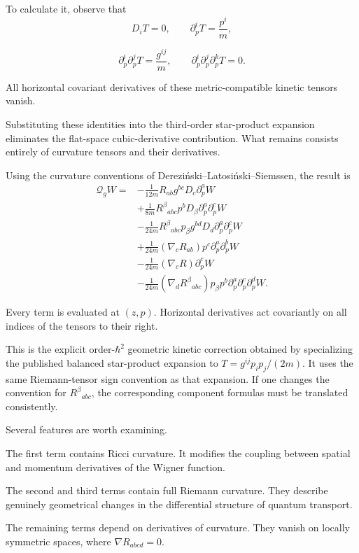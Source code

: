 To calculate it, observe that
\[
D_iT=0,\qquad
\partial_p^iT=\frac{p^i}{m},
\]

\[
\partial_p^i\partial_p^jT=\frac{g^{ij}}m,
\qquad
\partial_p^i\partial_p^j\partial_p^kT=0.
\tag{51}
\]

All horizontal covariant derivatives of these metric-compatible kinetic tensors vanish.

Substituting these identities into the third-order star-product expansion eliminates the flat-space cubic-derivative contribution. What remains consists entirely of curvature tensors and their derivatives.

Using the curvature conventions of Dereziński–Latosiński–Siemssen, the result is
\[
\boxed{
\begin{aligned}
\mathcal Q_gW={}&
-\frac1{12m}R_{ab}g^{bc}
D_c\partial_p^aW\\[2pt]
&+\frac1{8m}
R^\beta{}_{abc}p^b
D_\beta\partial_p^a\partial_p^cW\\[2pt]
&-\frac1{24m}
R^\beta{}_{abc}p_\beta g^{bd}
D_d\partial_p^a\partial_p^cW\\[2pt]
&+\frac1{24m}
(\nabla_cR_{ab})p^c
\partial_p^a\partial_p^bW\\[2pt]
&-\frac1{24m}
(\nabla_cR)\partial_p^cW\\[2pt]
&-\frac1{24m}
(\nabla_dR^\beta{}_{abc})p_\beta p^b
\partial_p^a\partial_p^c\partial_p^dW.
\end{aligned}
}
\tag{52}
\]

Every term is evaluated at \((z,p)\). Horizontal derivatives act covariantly on all indices of the tensors to their right.

This is the explicit order-\(\hbar^2\) geometric kinetic correction obtained by specializing the published balanced star-product expansion to \(T=g^{ij}p_ip_j/(2m)\). It uses the same Riemann-tensor sign convention as that expansion. If one changes the convention for \(R^\beta{}_{abc}\), the corresponding component formulas must be translated consistently.

Several features are worth examining.

The first term contains Ricci curvature. It modifies the coupling between spatial and momentum derivatives of the Wigner function.

The second and third terms contain full Riemann curvature. They describe genuinely geometrical changes in the differential structure of quantum transport.

The remaining terms depend on derivatives of curvature. They vanish on locally symmetric spaces, where \(\nabla R_{abcd}=0\).

